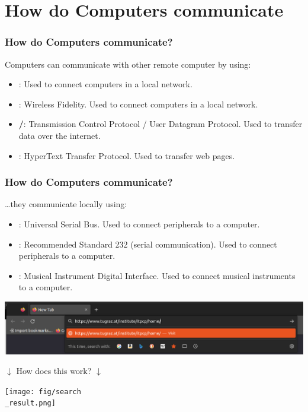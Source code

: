 \documentclass{beamer}
\begin{document}
\section{How do Computers communicate}
\begin{frame}
  \frametitle{How do Computers communicate?}
  Computers can communicate with other remote computer by using:\\
  \begin{itemize}
    \item \textbf{}: Used to connect computers in a local network.
    \item \textbf{}: Wireless Fidelity. Used to connect computers in a local network.
    \item \textbf{/}: Transmission Control Protocol / User Datagram Protocol. Used to transfer data over the internet.
    \item \textbf{}: HyperText Transfer Protocol. Used to transfer web pages.
  \end{itemize}
\end{frame}
\begin{frame}
  \frametitle{How do Computers communicate?}
  \dots they communicate locally using: \\
  \begin{itemize}
    \item \textbf{}: Universal Serial Bus. Used to connect peripherals to a computer.
    \item \textbf{}: Recommended Standard 232 (serial communication). Used to connect peripherals to a computer.
    \item \textbf{}: Musical Instrument Digital Interface. Used to connect musical instruments to a computer.
  \end{itemize}
\end{frame}
\begin{frame}
  
  \begin{center}
    \includegraphics[width=\textwidth]{fig/search.png}
  \end{center}
  \begin{center}
    $\downarrow$ How does this work? $\downarrow$
  \end{center}
  \begin{center}
    \texttt{[image: fig/search\\\_result.png]}
  \end{center}
\end{frame}
\end{document}
